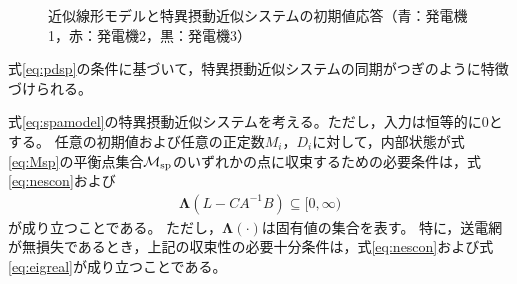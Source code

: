 \documentclass[tombow,dvipdfmx]{corona-a5}
\begin{document}
\begin{figure}[t]
{\begin{minipage}{0.32\linewidth}
  \end{minipage}
  \caption{近似線形モデルと特異摂動近似システムの初期値応答（青：発電機1，赤：発電機2，黒：発電機3）}
  \label{fig:timeexsp}
  }
\end{figure}

式\ref{eq:pdsp}の条件に基づいて，特異摂動近似システムの同期がつぎのように特徴づけられる。

\begin{定理}[特異摂動近似システムの同期]\label{thm:2ndsys}
式\ref{eq:spamodel}の特異摂動近似システムを考える。ただし，入力は恒等的に0とする。
任意の初期値および任意の正定数$M_i$，$D_i$に対して，内部状態が式\ref{eq:Msp}の平衡点集合$\mathcal{M}_{\rm sp}$のいずれかの点に収束するための必要条件は，式\ref{eq:nescon}および
\begin{align}\label{eq:eigreal}
\bm{\Lambda}(L-CA^{-1}B)\subseteq [0,\infty)
\end{align}
が成り立つことである。
ただし，$\bm{\Lambda}(\cdot)$は固有値の集合を表す。
特に，送電網が無損失であるとき，上記の収束性の必要十分条件は，式\ref{eq:nescon}および式\ref{eq:eigreal}が成り立つことである。
\end{定理}
\end{document}
